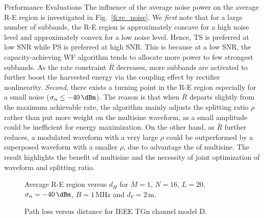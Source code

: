 \documentclass[journal]{IEEEtran}
\begin{document}
\begin{section}{Performance Evaluations}
		The influence of the average noise power on the average R-E region is investigated in Fig.~\ref{fi:re_noise}. We \textit{first} note that for a large number of subbands, the R-E region is approximately concave for a high noise level and approximately convex for a low noise level. Hence, TS is preferred at low SNR while PS is preferred at high SNR. This is because at a low SNR, the capacity-achieving WF algorithm tends to allocate more power to few strongest subbands. As the rate constraint $\bar{R}$ decreases, more subbands are activated to further boost the harvested energy via the coupling effect by rectifier nonlinearity. \textit{Second}, there exists a turning point in the R-E region especially for a small noise ($\sigma_n \le -40\,\si{\dBm}$). The reason is that when $\bar{R}$ departs slightly from the maximum achievable rate, the algorithm mainly adjusts the splitting ratio $\rho$ rather than put more weight on the multisine waveform, as a small amplitude could be inefficient for energy maximization. On the other hand, as $\bar{R}$ further reduces, a modulated waveform with a very large $\rho$ could be outperformed by a superposed waveform with a smaller $\rho$, due to advantage the of multisine. The result highlights the benefit of multisine and the necessity of joint optimization of waveform and splitting ratio.

		\begin{figure}[!t]
			\centering
			\begin{adjustbox}{width=\linewidth}
				
			\end{adjustbox}
			\caption{Average R-E region versus $d_H$ for $M=1$, $N=16$, $L=20$, $\sigma_n=-40\,\si{\dBm}$, $B=1\,\si{\MHz}$ and $d_V=2\,\si{\meter}$.}
			\label{fi:re_distance}
		\end{figure}

		\begin{figure}[!t]
			\centering
			\begin{adjustbox}{width=\linewidth}
				
			\end{adjustbox}
			\caption{Path loss versus distance for IEEE TGn channel model D.}
			\label{fi:path_loss}
		\end{figure}


\end{section}
\end{document}
